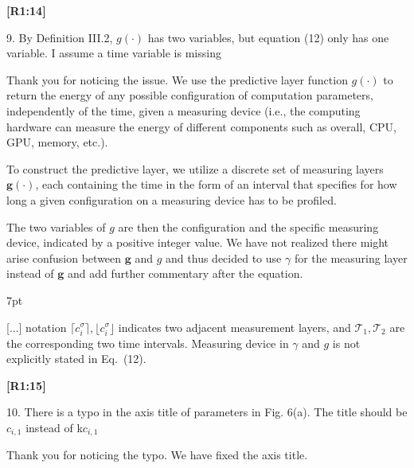 \documentclass[10pt]{letter}
\newenvironment{formal}{%
  \def\FrameCommand{%
    \hspace{1pt}%
    {\color{red}\vrule width 2pt}%
    {\color{formalshade}\vrule width 4pt}%
    \colorbox{formalshade}%
  }%
  \MakeFramed{\advance\hsize-\width\FrameRestore}%
  \noindent\hspace{-4.55pt}%
  \begin{adjustwidth}{}{7pt}%
  \vspace{2pt}\vspace{2pt}%
}
{%
  \vspace{2pt}\end{adjustwidth}\endMakeFramed%
}
\begin{document}
{\hspace*{-4.5em}\textbf{[R1:14]}\vspace*{-1.9em}}

9. By Definition III.2, $g(\cdot)$ has two variables, but equation (12) only has one variable. I assume a time variable is missing

{\color{blue} 

{\hspace*{-4.5em}{[R1:14]}\vspace*{-1.9em}}

Thank you for noticing the issue. We use the predictive layer function $g(\cdot)$ to return the energy of any possible configuration of computation parameters, independently of the time, given a measuring device (i.e., the computing hardware can measure the energy of different components such as overall, CPU, GPU, memory, etc.). 

To construct the predictive layer, we utilize a discrete set of measuring layers $\mathbf{g}(\cdot)$, each containing the time in the form of an interval that specifies for how long a given configuration on a measuring device has to be profiled.

The two variables of $g$ are then the configuration and the specific measuring device, indicated by a positive integer value.
We have not realized there might arise confusion between $\mathbf{g}$ and $g$ and thus decided to use $\gamma$ for the measuring layer instead of $\mathbf{g}$ and add further commentary after the equation.

\begin{formal}
  \color{black}
  [...] notation $\lceil c_i^\sigma\rceil,\lfloor c_i^\sigma\rfloor$ indicates two adjacent measurement layers, and $\mathcal{T}_1,\mathcal{T}_2$ are the corresponding two time intervals. {\color{blue}M}easuring device in $\gamma$ and $g$ is {\color{blue}not explicitly stated in Eq.~({\color{red}12})}.
  \vspace*{1ex}
\end{formal}



}

{\hspace*{-4.5em}\textbf{[R1:15]}\vspace*{-1.9em}}

10. There is a typo in the axis title of parameters in Fig. 6(a). The title should be $c_{i,1}$ instead of k$c_{i,1}$

{\color{blue} 

{\hspace*{-4.5em}{[R1:15]}\vspace*{-1.9em}}

Thank you for noticing the typo. We have fixed the axis title.
}
\end{document}
